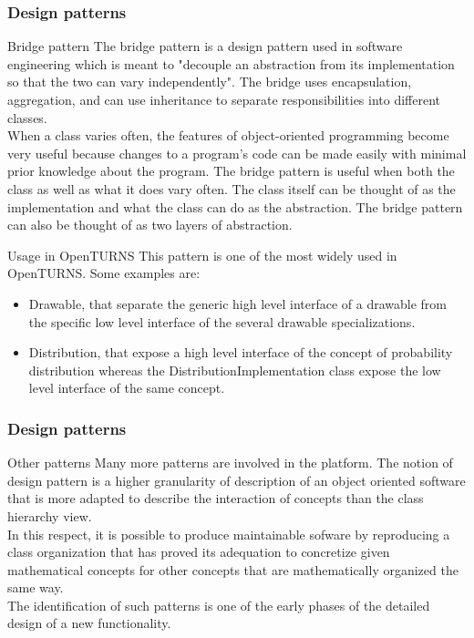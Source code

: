 \documentclass[8pt]{beamer}
\begin{document}
\begin{frame}
  \frametitle{Design patterns}
  \begin{block}{Bridge pattern}
    The \alert{bridge pattern} is a design pattern used in software engineering which is meant to "decouple an abstraction from its implementation so that the two can vary independently". The bridge uses encapsulation, aggregation, and can use inheritance to separate responsibilities into different classes.\\
    When a class varies often, the features of object-oriented programming become very useful because changes to a program's code can be made easily with minimal prior knowledge about the program. The bridge pattern is useful when both the class as well as what it does vary often. The class itself can be thought of as the implementation and what the class can do as the abstraction. The bridge pattern can also be thought of as two layers of abstraction.
  \end{block}
  \begin{block}{Usage in OpenTURNS}
    This pattern is one of the most widely used in OpenTURNS. Some examples are:
    \begin{itemize}
    \item \alert{Drawable}, that separate the generic high level interface of a drawable from the specific low level interface of the several drawable specializations.
    \item \alert{Distribution}, that expose a high level interface of the concept of probability distribution whereas the DistributionImplementation class expose the low level interface of the same concept.
    \end{itemize}
  \end{block}
\end{frame}
\begin{frame}
  \frametitle{Design patterns}
  \begin{block}{Other patterns}
    Many more patterns are involved in the platform. The notion of design pattern is a higher granularity of description of an object oriented software that is more adapted to describe the interaction of concepts than the class hierarchy view.\\
    In this respect, it is possible to produce maintainable sofware by reproducing a class organization that has proved its adequation to concretize given mathematical concepts for other concepts that are mathematically organized the same way.\\
    The identification of such patterns is one of the early phases of the detailed design of a new functionality.
  \end{block}
\end{frame}
\end{document}
